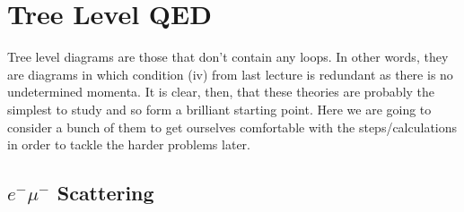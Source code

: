 \chapter{Tree Level QED}

Tree level diagrams are those that don't contain any loops. In other words, they are diagrams in which condition (iv) from last lecture is redundant as there is no undetermined momenta. It is clear, then, that these theories are probably the simplest to study and so form a brilliant starting point. Here we are going to consider a bunch of them to get ourselves comfortable with the steps/calculations in order to tackle the harder problems later. 

\section{$e^-\mu^-$ Scattering}

